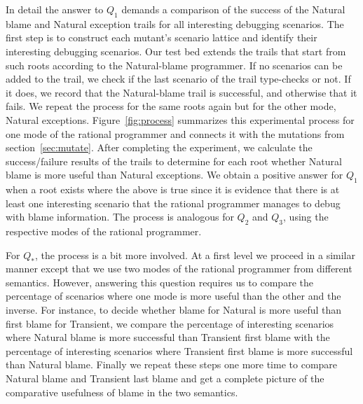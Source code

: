 
In detail the answer to $Q_1$ demands a comparison of the success of the 
Natural blame and Natural exception trails for all interesting 
debugging scenarios.
  The first step is to construct each
mutant's scenario lattice and identify their interesting debugging
scenarios.
Our test
bed extends the trails that start from such roots according to the Natural-blame programmer.  If no scenarios
can be added to the trail, we check if
the last scenario of the trail type-checks or not. If it does, we record that the Natural-blame
trail is successful, and otherwise that it fails. We repeat the process for the
same roots again but for the other mode, Natural exceptions.
 Figure~\ref{fig:process}
summarizes this
experimental process for one mode of the rational programmer and connects
it with the mutations from section~\ref{sec:mutate}.
After completing the experiment, we calculate the
success/failure results of the trails to determine for each root whether Natural blame
is more useful than Natural exceptions. We
obtain a positive answer for
$Q_1$ when a root exists where the above is true since it is evidence that
there is at least one interesting scenario that the rational programmer
manages to debug with blame information. 
The process is analogous for $Q_2$ and $Q_3$, using the respective
modes of the rational programmer.

For $Q_*$, the process is a bit more
involved. At a first level we proceed in a similar
manner except that we use two modes 
of the rational programmer from different semantics.
However, answering this question requires us to compare the percentage of scenarios
where one mode is more useful than the other and the inverse.
For instance, to
decide whether blame for Natural is more useful than first blame for Transient, 
we compare the percentage of interesting scenarios where 
Natural blame is more successful than Transient first blame 
with the percentage of interesting scenarios where Transient first blame 
is more successful than Natural blame. 
Finally we repeat these steps one more time to compare Natural blame and Transient last blame
and get a complete picture of the comparative usefulness of blame
in the two semantics.

